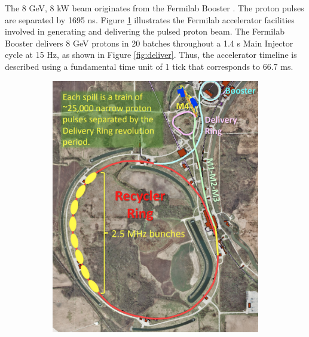 The 8 GeV, 8 kW beam originates from the Fermilab Booster \cite{PhysRevAccelBeams.20.111003}. 
The proton pulses are separated by 1695 ns. Figure \ref{fig:accell} 
illustrates the Fermilab accelerator facilities involved in generating and delivering 
the pulsed proton beam. The Fermilab Booster delivers 8 GeV protons in 20 batches 
throughout a 1.4 s Main Injector cycle at 15 Hz, as shown in Figure \ref{fig:deliver}. 
Thus, the accelerator timeline is described using a fundamental time unit of 1 tick that corresponds to 66.7 ms.

\begin{figure}[!h]
     \begin{subfigure}[b]{0.4\linewidth}
         \centering
         \includegraphics[scale = 0.3]{figures/png/Screenshot_20240301_151449.png}
         \label{fig:accell}
     \end{subfigure}
     \begin{subfigure}[b]{0.7\linewidth}
         \centering

\end{subfigure}
\end{figure}

